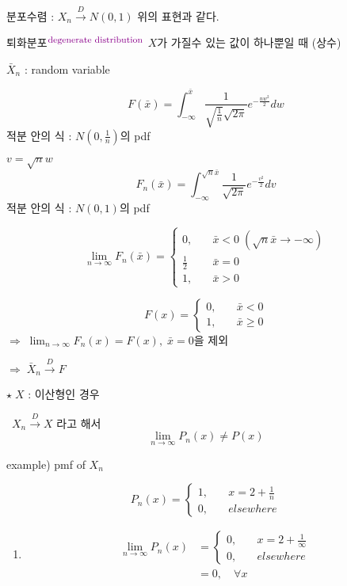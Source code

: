 \documentclass{oblivoir}
\newcommand{\DC}[1]{\textcolor{DarkMagenta}{#1}}%
\newcommand{\UP}[1]{$^{\mbox{\DC{\footnotesize #1}}}$}
\begin{document}
\begin{itemize}
분포수렴 : $X_n \overset{D}{\longrightarrow} N(0,1)$ 위의 표현과 같다.

\begin{myframe}{퇴화분포\UP{degenerate distribution}}
$X$가 가질수 있는 값이 하나뿐일 때 (상수)

$\bar{X}_n$ : random variable

$$
F(\bar{x}) = \int_{-\infty}^{\bar{x}} \frac{1}{\sqrt{\frac{1}{n}} \sqrt{2 \pi}} e^{- \frac{n w^2}{2}} dw
$$
적분 안의 식 : $N\left(0, \frac{1}{n} \right)$의 pdf

$v = \sqrt{n}w$
$$
F_n(\bar{x}) = \int_{-\infty}^{\sqrt{n} \bar{x}} \frac{1}{\sqrt{2\pi}} e^{-\frac{v^2}{2}} dv
$$
적분 안의 식 : $N(0,1)$의 pdf

$$
\lim_{n \rightarrow \infty} F_n(\bar{x}) = 
\begin{cases}
0, \quad& \bar{x} < 0 \; (\sqrt{n} \bar{x} \rightarrow -\infty) \\
\frac{1}{2} & \bar{x} = 0 \\
1, & \bar{x} > 0
\end{cases}
$$

$$
F(x) = 
\begin{cases}
0, \quad & \bar{x} < 0 \\
1, & \bar{x} \geq 0
\end{cases}
$$
$\Rightarrow \; \lim_{n \rightarrow \infty} F_n(x) = F(x), \; \bar{x} = 0$을 제외

$\Rightarrow \; \bar{X}_n \overset{D}{\longrightarrow} F$

$\star \; X$ : 이산형인 경우

~$X_n \overset{D}{\rightarrow} X$ 라고 해서
$$
\lim_{n \rightarrow \infty} P_n(x) \ne P(x)
$$
\end{myframe}

example) pmf of $X_n$

$$
P_n(x) = 
\begin{cases}
1, \quad & x = 2 + \frac{1}{n} \\
0, & elsewhere
\end{cases}
$$

\begin{enumerate}
\item 
\begin{align*}
\lim_{n \rightarrow \infty} P_n(x) &= 
\begin{cases}
0, \quad & x = 2 + \frac{1}{\infty} \\
0, & elsewhere
\end{cases} \\
&= 0, \quad \forall x
\end{align*}


\end{enumerate}
\end{itemize}
\end{document}
